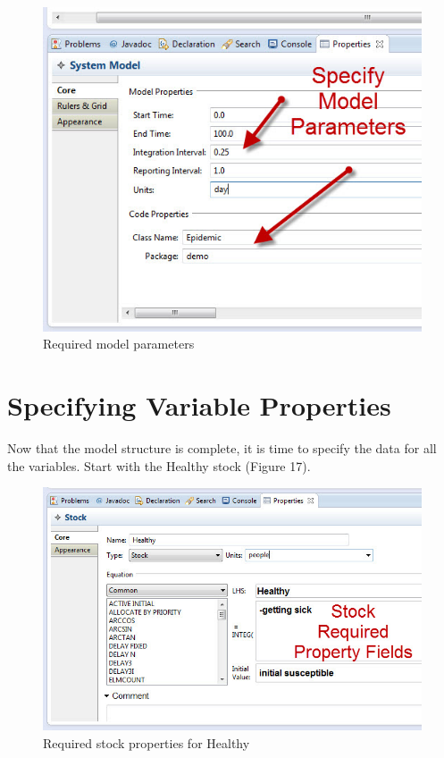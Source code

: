 \documentclass[11pt]{amsart}
\begin{document}
\begin{figure}[ht]
\begin{center}
\vspace{.2in}
\centerline {
\includegraphics[totalheight=0.4\textheight]{images/016.jpg}
}
\caption{Required model parameters}
\label{fig:016}
\end{center}
\end{figure}

\clearpage


\section{Specifying Variable Properties}
Now that the model structure is complete, it is time to specify the data for all the variables. Start with the Healthy stock (Figure 17).



\begin{figure}[ht]
\begin{center}
\vspace{.2in}
\centerline {
\includegraphics[totalheight=0.3\textheight]{images/017.jpg}
}
\caption{Required stock properties for Healthy}
\label{fig:017}
\end{center}
\end{figure}
\end{document}
